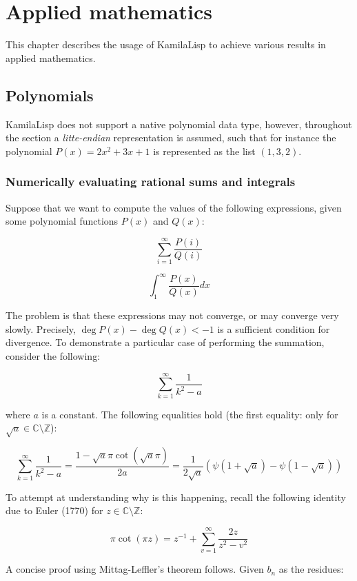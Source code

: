
\chapter{Applied mathematics}

This chapter describes the usage of KamilaLisp to achieve various results in applied mathematics.

\section{Polynomials}

KamilaLisp does not support a native polynomial data type, however, throughout the section a \textit{litte-endian} representation is assumed, such that for instance the polynomial $P(x) = 2x^2 + 3x + 1$ is represented as the list $(1, 3, 2)$.

\subsection{Numerically evaluating rational sums and integrals}

Suppose that we want to compute the values of the following expressions, given some polynomial functions $P(x)$ and $Q(x)$:

$$
\sum_{i=1}^\infty \frac{P(i)}{Q(i)}
$$

$$
\int_1^\infty \frac{P(x)}{Q(x)} dx
$$

\noindent The problem is that these expressions may not converge, or may converge very slowly. Precisely, $\deg P(x) - \deg Q(x) < -1$ is a sufficient condition for divergence. To demonstrate a particular case of performing the summation, consider the following:

$$\sum_{k=1}^\infty \frac{1}{k^2 - a}$$

\noindent where $a$ is a constant. The following equalities hold (the first equality: only for $\sqrt{a} \in \mathbb{C} \setminus \mathbb{Z}$):

$$\sum_{k=1}^\infty \frac{1}{k^2 - a} = \frac{1-\sqrt{a}\pi\cot(\sqrt{a}\pi)}{2a} = \frac{1}{2\sqrt{a}}\left(\psi\left(1+\sqrt{a}\right)-\psi\left(1-\sqrt{a}\right)\right)$$

\noindent To attempt at understanding why is this happening, recall the following identity due to Euler (1770) for $z \in \mathbb{C} \setminus \mathbb{Z}$:

$$
\pi \cot(\pi z) = z^{-1} + \sum_{v=1}^\infty \frac{2z}{z^2 - v^2}
$$

\noindent A concise proof using Mittag-Leffler's theorem follows. Given $b_n$ as the residues:


